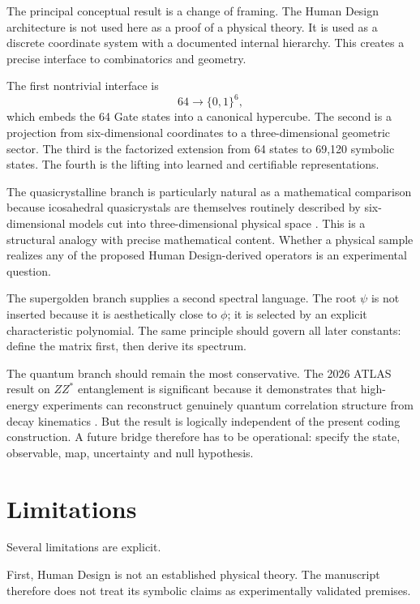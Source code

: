 \documentclass[11pt,a4paper]{article}
\numberwithin{equation}{section}
\begin{document}
The principal conceptual result is a change of framing. The Human Design architecture is not used here as a proof of a physical theory. It is used as a discrete coordinate system with a documented internal hierarchy. This creates a precise interface to combinatorics and geometry.

The first nontrivial interface is
\[
64\rightarrow\{0,1\}^6,
\]
which embeds the 64 Gate states into a canonical hypercube. The second is a projection from six-dimensional coordinates to a three-dimensional geometric sector. The third is the factorized extension from 64 states to 69,120 symbolic states. The fourth is the lifting into learned and certifiable representations.

The quasicrystalline branch is particularly natural as a mathematical comparison because icosahedral quasicrystals are themselves routinely described by six-dimensional models cut into three-dimensional physical space \citep{VanSmaalen1991,YamamotoTakakura2003}. This is a structural analogy with precise mathematical content. Whether a physical sample realizes any of the proposed Human Design-derived operators is an experimental question.

The supergolden branch supplies a second spectral language. The root $\psi$ is not inserted because it is aesthetically close to $\phi$; it is selected by an explicit characteristic polynomial. The same principle should govern all later constants: define the matrix first, then derive its spectrum.

The quantum branch should remain the most conservative. The 2026 ATLAS result on $ZZ^*$ entanglement is significant because it demonstrates that high-energy experiments can reconstruct genuinely quantum correlation structure from decay kinematics \citep{ATLASZEntanglement2026}. But the result is logically independent of the present coding construction. A future bridge therefore has to be operational: specify the state, observable, map, uncertainty and null hypothesis.

\section{Limitations}
\label{sec:limitations}

Several limitations are explicit.

First, Human Design is not an established physical theory. The manuscript therefore does not treat its symbolic claims as experimentally validated premises.
\end{document}
